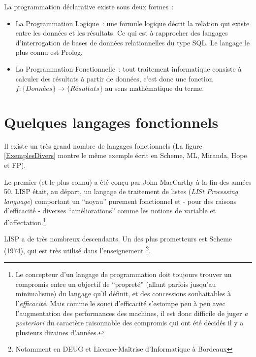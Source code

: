 La programmation déclarative existe sous deux formes~:

\begin{itemize}
\item La Programmation Logique~:  une formule logique décrit 
la relation qui existe entre les données et les résultats. Ce qui est
à rapprocher des langages d'interrogation de bases de données
relationnelles du type SQL. Le langage le plus connu est Prolog.
\item
La Programmation Fonctionnelle~: tout traitement informatique consiste
à calculer des résultats à partir de données, c'est donc une fonction
$f : \{Données\} \rightarrow \{Résultats\}$ au sens mathématique du terme.
\end{itemize}

\section{Quelques langages fonctionnels}

Il existe un très grand nombre de langages fonctionnels (La figure
\ref{ExemplesDivers} montre le même exemple écrit en 
Scheme, ML, Miranda, Hope et FP).

Le premier (et le plus connu) a été con\c{c}u par John MacCarthy à la
fin des années 50. LISP  était, au départ, un langage de
traitement de listes (\emph{LISt Processing language}) comportant un
``noyau'' purement fonctionnel et - pour des raisons d'efficacité -
diverses ``améliorations'' comme les notions de variable et
d'affectation.\footnote{Le concepteur d'un langage de programmation
doit toujours trouver un compromis entre un objectif de ``propreté''
(allant parfois jusqu'au minimalisme) du langage qu'il définit, et des
concessions souhaitables à l'{\em efficacité}.  Mais comme le souci
d'efficacité s'estompe peu à peu avec l'augmentation des performances
des machines, il est donc difficile de juger {\em a posteriori} du
caractère raisonnable des compromis qui ont été décidés il y a
plusieurs dizaines d'années.}

LISP a de très nombreux descendants. Un des plus prometteurs est
Scheme (1974), qui est très utilisé dans l'enseignement
\footnote{Notamment en 
DEUG et Licence-Maîtrise d'Informatique à Bordeaux}.



